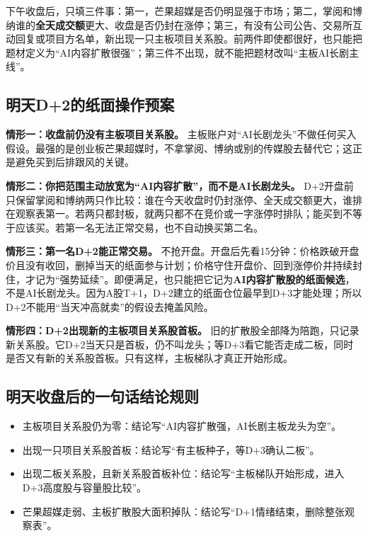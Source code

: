 下午收盘后，只填三件事：第一，芒果超媒是否仍明显强于市场；第二，掌阅和博纳谁的\textbf{全天成交额}更大、收盘是否仍封在涨停；第三，有没有公司公告、交易所互动回复或项目方名单，新出现一只主板项目关系股。前两件即使都很好，也只能把题材定义为“AI内容扩散很强”；第三件不出现，就不能把题材改叫“主板AI长剧主线”。

\subsection*{明天D+2的纸面操作预案}

\textbf{情形一：收盘前仍没有主板项目关系股。} 主板账户对“AI长剧龙头”不做任何买入假设。最强的是创业板芒果超媒时，不拿掌阅、博纳或别的传媒股去替代它；这正是避免买到后排跟风的关键。

\textbf{情形二：你把范围主动放宽为“AI内容扩散”，而不是AI长剧龙头。} D+2开盘前只保留掌阅和博纳两只作比较：谁在今天收盘时仍封涨停、全天成交额更大，谁排在观察表第一。若两只都封板，就两只都不在竞价或一字涨停时排队；能买到不等于应该买。若第一名无法正常交易，也不自动换买第二名。

\textbf{情形三：第一名D+2能正常交易。} 不抢开盘。开盘后先看15分钟：价格跌破开盘价且没有收回，删掉当天的纸面参与计划；价格守住开盘价、回到涨停价并持续封住，才记为“强势延续”。即便满足，也只能把它记为\textbf{AI内容扩散股的纸面候选}，不是AI长剧龙头。因为A股T+1，D+2建立的纸面仓位最早到D+3才能处理；所以D+2不能用“当天冲高就卖”的假设去掩盖风险。

\textbf{情形四：D+2出现新的主板项目关系股首板。} 旧的扩散股全部降为陪跑，只记录新关系股。它D+2当天只是首板，仍不叫龙头；等D+3看它能否走成二板，同时是否又有新的关系股首板。只有这样，主板梯队才真正开始形成。

\subsection*{明天收盘后的一句话结论规则}

\begin{itemize}
  \item 主板项目关系股仍为零：结论写“AI内容扩散强，AI长剧主板龙头为空”。
  \item 出现一只项目关系股首板：结论写“有主板种子，等D+3确认二板”。
  \item 出现二板关系股，且新关系股首板补位：结论写“主板梯队开始形成，进入D+3高度股与容量股比较”。
  \item 芒果超媒走弱、主板扩散股大面积掉队：结论写“D+1情绪结束，删除整张观察表”。
\end{itemize}

